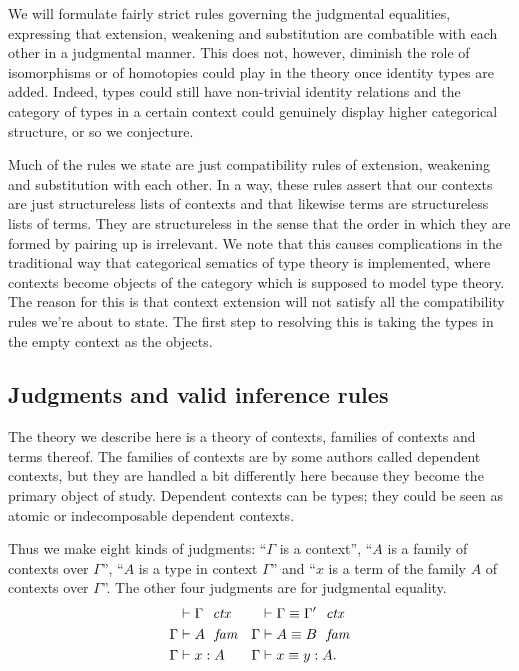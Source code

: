 We will formulate fairly strict rules governing the judgmental equalities,
expressing that extension, weakening and substitution are combatible with
each other in a judgmental manner. This does not, however, diminish the role
of isomorphisms or of homotopies could play in the theory once identity types
are added. Indeed, types could still have non-trivial identity relations and
the category of types in a certain context could genuinely display higher
categorical structure, or so we conjecture.

Much of the rules we state are just compatibility rules of extension, weakening
and substitution with each other. In a way, these rules assert that our contexts
are just structureless lists of contexts and that likewise terms are structureless
lists of terms. They are structureless in the sense that the order in which
they are formed by pairing up is irrelevant. We note that this causes complications
in the traditional way that categorical sematics of type theory is implemented,
where contexts become objects of the category which is supposed to model type
theory. The reason for this is that context extension will not satisfy all the
compatibility rules we're about to state. The first step to resolving this is taking
the types in the empty context as the objects. 

\subsection{Judgments and valid inference rules}\label{judgments}
The theory we describe here is a theory of contexts, families of
contexts and terms thereof. The families of contexts are by some authors called
dependent contexts, but they are handled a bit differently here because they
become the primary object of study. Dependent contexts can be types; they could
be seen as atomic or indecomposable dependent contexts.

Thus we make eight kinds of judgments: ``$\Gamma$ is a context'',
``$A$ is a family of contexts over $\Gamma$'', ``$A$ is a type in context $\Gamma$''
and ``$x$ is a term of the family $A$ of contexts over $\Gamma$''. The other four
judgments are for judgmental equality.
\begin{align*}
\jctx*{\Gamma} 
& \jctxeq*{\Gamma}{\Gamma'}
  \\
\jfam*{\Gamma}{A} 
& \jfameq*{\Gamma}{A}{B}
  \\
\jterm*{\Gamma}{A}{x} 
& \jtermeq*{\Gamma}{A}{x}{y}.
\end{align*}

